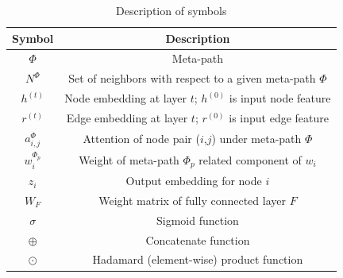 \begin{table}[]
\caption{Description of symbols}
\centering
\begin{tabular}{cc}
\hline
Symbol       & Description                                                       \\ \hline
$\Phi$         & Meta-path                                                         \\
$N^\Phi$       & Set of neighbors with respect to a given meta-path $\Phi$          \\
$h^{(t)}$        & Node embedding at layer $t$; $h^{(0)}$ is input node feature \\
$r^{(t)}$        & Edge embedding at layer $t$; $r^{(0)}$ is input edge feature \\
$a_{i,j}^\Phi$ & Attention of node pair ($i$,$j$) under meta-path $\Phi$    \\
$w_i^{\Phi_p}$   &  Weight of meta-path $\Phi_p$  related component of $w_i$\\
$z_i$            & Output embedding for node $i$                                     \\
$W_F$          & Weight matrix of fully connected layer $F$          \\
$\sigma$       & Sigmoid function                                                  \\
$\oplus$       & Concatenate function \\
$\odot$       & Hadamard (element-wise) product function \\
\hline
\end{tabular}
\label{table:notation}
\end{table}











